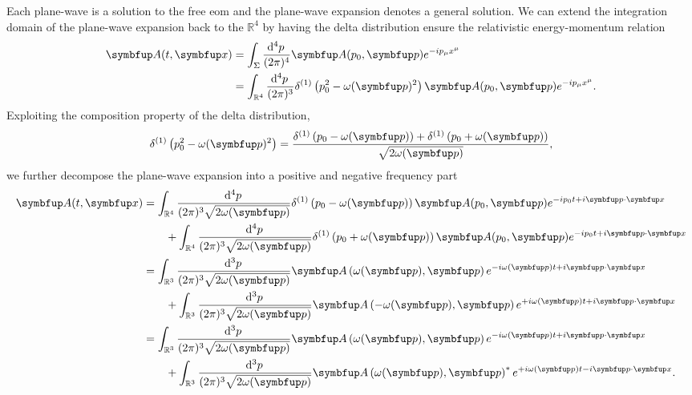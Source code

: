 Each plane-wave is a solution to the free \gls{eom} and the plane-wave expansion denotes a general solution.
We can extend the integration domain of the plane-wave expansion back to the $\mathbb{R}^4$ by having the delta distribution ensure the relativistic energy-momentum relation
\begin{equation}
	\begin{split}
		\vb{A}(t,\vb{x})
		&=
		\int_\Sigma\frac{\dd[4]{p}}{(2\pi)^4}
		\vb{A}(p_0,\vb{p})
		e^{-ip_\mu x^\mu}
		\\
		&=
		\int_{\mathbb{R}^4}\frac{\dd[4]{p}}{(2\pi)^3}
		\delta^{(1)}
		\left(
			p_0^2
			-
			\omega(\vb{p})^2
		\right)
		\vb{A}(p_0,\vb{p})
		e^{-ip_\mu x^\mu}
		.
	\end{split}
\end{equation}
Exploiting the composition property of the delta distribution,
\begin{equation}
	\delta^{(1)}
	\left(
		p_0^2
		-
		\omega(\vb{p})^2
	\right)
	=
	\frac{
		\delta^{(1)}
		\left(p_0-\omega(\vb{p})\right)
		+
		\delta^{(1)}
		\left(p_0+\omega(\vb{p})\right)
	}{\sqrt{2\omega(\vb{p})}}
	,
\end{equation}
we further decompose the plane-wave expansion into a positive and negative frequency part
\begin{equation}
	\begin{split}
		\vb{A}(t,\vb{x})
		&=
		\int_{\mathbb{R}^4}\frac{\dd[4]{p}}{(2\pi)^3\sqrt{2\omega(\vb{p})}}
		\delta^{(1)}
		\left(
			p_0
			-
			\omega(\vb{p})
		\right)
		\vb{A}(p_0,\vb{p})
		e^{-ip_0t+i\vb{p}\vdot\vb{x}}
		\\
		&\qquad+
		\int_{\mathbb{R}^4}\frac{\dd[4]{p}}{(2\pi)^3\sqrt{2\omega(\vb{p})}}
		\delta^{(1)}
		\left(
			p_0
			+
			\omega(\vb{p})
		\right)
		\vb{A}(p_0,\vb{p})
		e^{-ip_0t+i\vb{p}\vdot\vb{x}}
		\\
		&=
		\int_{\mathbb{R}^3}\frac{\dd[3]{p}}{(2\pi)^3\sqrt{2\omega(\vb{p})}}
		\vb{A}\left(\omega(\vb{p}),\vb{p}\right)
		e^{-i\omega(\vb{p})t+i\vb{p}\vdot\vb{x}}
		\\
		&\qquad+
		\int_{\mathbb{R}^3}\frac{\dd[3]{p}}{(2\pi)^3\sqrt{2\omega(\vb{p})}}
		\vb{A}\left(-\omega(\vb{p}),\vb{p}\right)
		e^{+i\omega(\vb{p})t+i\vb{p}\vdot\vb{x}}
		\\
		&=
		\int_{\mathbb{R}^3}\frac{\dd[3]{p}}{(2\pi)^3\sqrt{2\omega(\vb{p})}}
		\vb{A}\left(\omega(\vb{p}),\vb{p}\right)
		e^{-i\omega(\vb{p})t+i\vb{p}\vdot\vb{x}}
		\\
		&\qquad+
		\int_{\mathbb{R}^3}\frac{\dd[3]{p}}{(2\pi)^3\sqrt{2\omega(\vb{p})}}
		\vb{A}\left(\omega(\vb{p}),\vb{p}\right)^*
		e^{+i\omega(\vb{p})t-i\vb{p}\vdot\vb{x}}
		.
	\end{split}
	\label{eq:maxwell_plane_wave_expansion}
\end{equation}
